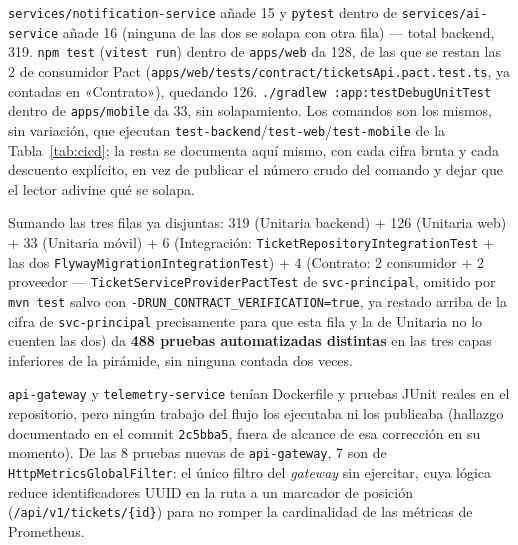 \texttt{services/notification-service} añade 15 y \texttt{pytest} dentro de
\texttt{services/ai-service} añade 16 (ninguna de las dos se solapa con otra fila) — total
backend, 319. \texttt{npm test} (\texttt{vitest run}) dentro de \texttt{apps/web} da 128, de las
que se restan las 2 de consumidor Pact
(\texttt{apps/web/tests/contract/ticketsApi.pact.test.ts}, ya contadas en «Contrato»), quedando
126. \texttt{./gradlew :app:testDebugUnitTest} dentro de \texttt{apps/mobile} da 33, sin
solapamiento. Los comandos son los mismos, sin variación, que ejecutan
\texttt{test-backend}/\texttt{test-web}/\texttt{test-mobile} de la Tabla~\ref{tab:cicd}; la resta
se documenta aquí mismo, con cada cifra bruta y cada descuento explícito, en vez de publicar el
número crudo del comando y dejar que el lector adivine qué se solapa.

Sumando las tres filas ya disjuntas: 319 (Unitaria backend) + 126 (Unitaria web) + 33 (Unitaria
móvil) + 6 (Integración: \texttt{TicketRepositoryIntegrationTest} + las dos
\texttt{FlywayMigrationIntegrationTest}) + 4 (Contrato: 2 consumidor + 2 proveedor —
\texttt{TicketServiceProviderPactTest} de \texttt{svc-principal}, omitido por \texttt{mvn test}
salvo con \texttt{-DRUN\_CONTRACT\_VERIFICATION=true}, ya restado arriba de la cifra de
\texttt{svc-principal} precisamente para que esta fila y la de Unitaria no lo cuenten las dos) da
\textbf{488 pruebas automatizadas distintas} en las tres capas inferiores de la pirámide, sin
ninguna contada dos veces.

\texttt{api-gateway} y \texttt{telemetry-service} tenían Dockerfile y pruebas JUnit reales en el
repositorio, pero ningún trabajo del flujo los ejecutaba ni los publicaba (hallazgo documentado
en el commit \texttt{2c5bba5}, fuera de alcance de esa corrección en su momento). De las 8 pruebas
nuevas de \texttt{api-gateway}, 7 son de \texttt{HttpMetricsGlobalFilter}: el único filtro del
\emph{gateway} sin ejercitar, cuya lógica reduce identificadores UUID en la ruta a un marcador de
posición (\texttt{/api/v1/tickets/\{id\}}) para no romper la cardinalidad de las métricas de
Prometheus.


